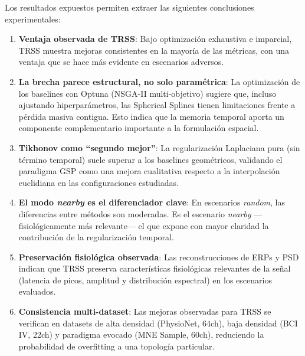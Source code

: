 Los resultados expuestos permiten extraer las siguientes conclusiones experimentales:

\begin{enumerate}
  \item \textbf{Ventaja observada de TRSS}: Bajo optimización exhaustiva e imparcial, TRSS muestra mejoras consistentes en la mayoría de las métricas, con una ventaja que se hace más evidente en escenarios adversos.

  \item \textbf{La brecha parece estructural, no solo paramétrica}: La optimización de los baselines con Optuna (NSGA-II multi-objetivo) sugiere que, incluso ajustando hiperparámetros, las Spherical Splines tienen limitaciones frente a pérdida masiva contigua. Esto indica que la memoria temporal aporta un componente complementario importante a la formulación espacial.

  \item \textbf{Tikhonov como ``segundo mejor''}: La regularización Laplaciana pura (sin término temporal) suele superar a los baselines geométricos, validando el paradigma GSP como una mejora cualitativa respecto a la interpolación euclidiana en las configuraciones estudiadas.

  \item \textbf{El modo \textit{nearby} es el diferenciador clave}: En escenarios \textit{random}, las diferencias entre métodos son moderadas. Es el escenario \textit{nearby} ---fisiológicamente más relevante--- el que expone con mayor claridad la contribución de la regularización temporal.

  \item \textbf{Preservación fisiológica observada}: Las reconstrucciones de ERPs y PSD indican que TRSS preserva características fisiológicas relevantes de la señal (latencia de picos, amplitud y distribución espectral) en los escenarios evaluados.

  \item \textbf{Consistencia multi-dataset}: Las mejoras observadas para TRSS se verifican en datasets de alta densidad (PhysioNet, 64ch), baja densidad (BCI IV, 22ch) y paradigma evocado (MNE Sample, 60ch), reduciendo la probabilidad de overfitting a una topología particular.
\end{enumerate}
